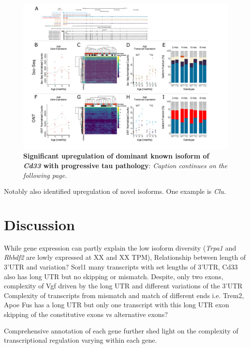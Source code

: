 \begin{landscape}
	\begin{figure}[htp]
		\begin{center}
			\includegraphics[page=8,trim={0 0.5cm 0 1.5cm},scale =0.85]{Figures/TargetGene_DifferentialAnalysis.pdf}
		\end{center}
		\captionsetup{width=1.5\textwidth}
		\caption[Differential Isoform Expression: Changes in transcript expression of isoforms associated with \textit{Bin1}]%
		{\textbf{Significant upregulation of dominant known isoform of \textit{Cd33} with progressive tau pathology}: \textit{Caption continues on the following page.}}   
		\label{fig:cd33_diff_analysis}
	\end{figure}
	\begin{figure}[p]
		\captionsetup{width=1.5\textwidth}
	\end{figure}
\end{landscape}


Notably also identified upregulation of novel isoforms. One example is \textit{Clu}.






\newpage
\section{Discussion}
While gene expression can partly explain the low isoform diversity (\textit{Trpa1} and \textit{Rhbdf2} are lowly expressed at XX and XX TPM), 
Relationship between length of 3'UTR and variation? Sorl1 many transcripts with set lengths of 3'UTR, Cd33 also has long UTR but no skipping or mismatch. Despite, only two exons, complexity of Vgf driven by the long UTR and different variations of the 3'UTR 
Complexity of transcripts from mismatch and match of different ends i.e. Trem2, Apoe
Fus has a long UTR but only one transcript with this long UTR 	
exon skipping of the constitutive exons vs alternative exons?

Comprehensive annotation of each gene further shed light on the complexity of transcriptional regulation varying within each gene.